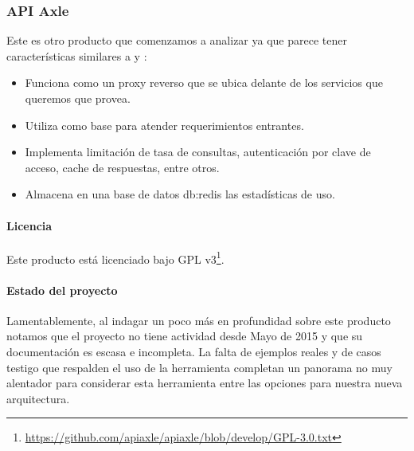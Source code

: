 \subsubsection{API Axle}
\label{soa:tecnologias:api-axle}

Este es otro producto que comenzamos a analizar ya que parece tener características similares a  y :

\begin{itemize}
  \item Funciona como un proxy reverso que se ubica delante de los servicios que queremos que provea.
  \item Utiliza  como base para atender requerimientos entrantes.
  \item Implementa limitación de tasa de consultas, autenticación por clave de acceso, cache de respuestas, entre otros.
  \item Almacena en una base de datos \gls{db:redis} las estadísticas de uso.
\end{itemize}

\paragraph{Licencia}

Este producto está licenciado bajo GPL v3\footnote{\url{https://github.com/apiaxle/apiaxle/blob/develop/GPL-3.0.txt}}.

\paragraph{Estado del proyecto}

Lamentablemente, al indagar un poco más en profundidad sobre este producto notamos que el proyecto no tiene actividad desde Mayo de 2015 y que su documentación es escasa e incompleta. La falta de ejemplos reales y de casos testigo que respalden el uso de la herramienta completan un panorama no muy alentador para considerar esta herramienta entre las opciones para nuestra nueva arquitectura.
